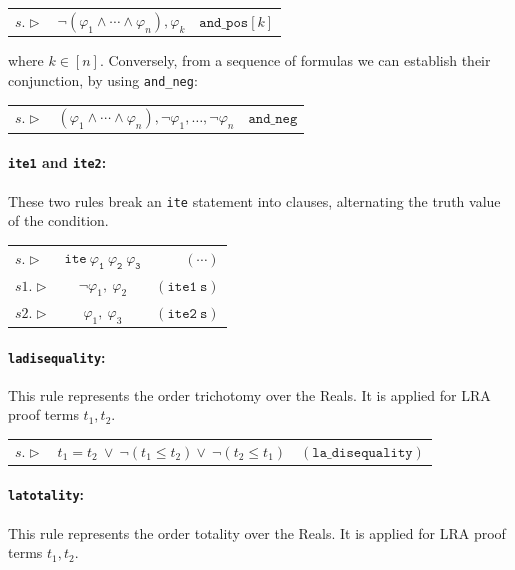 \noindent\begin{tabularx}{\linewidth}{ l C r }
	$s.\triangleright$ & 
	$\lnot(\varphi_1\wedge\cdots\wedge\varphi_n),\varphi_k$ & 
	$\mathtt{and\_pos}[k]$
\end{tabularx}

where $k\in[n]$.
Conversely, from a sequence of formulas we can establish their conjunction, by using \texttt{and\_neg}:

\noindent\begin{tabularx}{\linewidth}{ l C r }
	$s.\triangleright$ & 
	$(\varphi_1\wedge\cdots\wedge\varphi_n),\lnot\varphi_1,\dots,\lnot\varphi_n$ & 
	$\mathtt{and\_neg}$
\end{tabularx}

\paragraph{\texttt{ite1} and \texttt{ite2}:}
These two rules break an \texttt{ite} statement into clauses, alternating the truth value of the condition.


\noindent\begin{tabularx}{\linewidth}{ l C r }
	$s.\triangleright$ & 
	$\mathtt{ite \: \varphi_1 \: \varphi_2 \: \varphi_3}$ & 
	$(\cdots)$ \\
	$s1.\triangleright$ &
	$\lnot\varphi_1, \: \varphi_2$ &
	${\mathtt{(ite1 \: s)}}$ \\
	$s2.\triangleright$ &
	$\varphi_1, \: \varphi_3$ &
	${\mathtt{(ite2 \: s)}}$
\end{tabularx}

\paragraph{\texttt{la\textunderscore disequality}:} This rule represents the order trichotomy over the Reals. It is applied for \textsc{LRA} proof terms $t_1,t_2$.

\noindent\begin{tabularx}{\linewidth}{ l C r }
	$s.\triangleright$ & 
	$t_1 = t_2 \: \lor \: \lnot(t_1\leq t_2) \lor \: \lnot(t_2\leq t_1)$ & 
	${\mathtt{(la\_disequality)}}$
\end{tabularx}

\paragraph{\texttt{la\textunderscore totality}:} This rule represents the order totality over the Reals. It is applied for \textsc{LRA} proof terms $t_1,t_2$.

